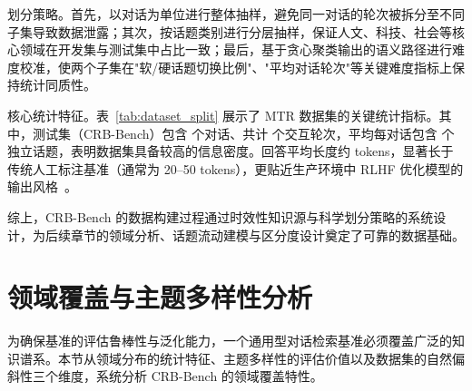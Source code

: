 划分策略。首先，以对话为单位进行整体抽样，避免同一对话的轮次被拆分至不同子集导致数据泄露；其次，按话题类别进行分层抽样，保证人文、科技、社会等核心领域在开发集与测试集中占比一致；最后，基于贪心聚类输出的语义路径进行难度校准，使两个子集在"软/硬话题切换比例"、"平均对话轮次"等关键难度指标上保持统计同质性。

核心统计特征。表~\ref{tab:dataset_split} 展示了 MTR 数据集的关键统计指标。其中，测试集（CRB-Bench）包含  个对话、共计  个交互轮次，平均每对话包含  个独立话题，表明数据集具备较高的信息密度。回答平均长度约  tokens，显著长于传统人工标注基准（通常为 20--50 tokens），更贴近生产环境中 RLHF 优化模型的输出风格~\citep{ouyang2022traininglanguagemodelsfollow}。

\begin{table}[t]
\centering
{}
\label{tab:dataset_split}
\end{table}

综上，CRB-Bench 的数据构建过程通过时效性知识源与科学划分策略的系统设计，为后续章节的领域分析、话题流动建模与区分度设计奠定了可靠的数据基础。


\section{领域覆盖与主题多样性分析}
\label{sec:domain_diversity}

为确保基准的评估鲁棒性与泛化能力，一个通用型对话检索基准必须覆盖广泛的知识谱系。本节从领域分布的统计特征、主题多样性的评估价值以及数据集的自然偏斜性三个维度，系统分析 CRB-Bench 的领域覆盖特性。

